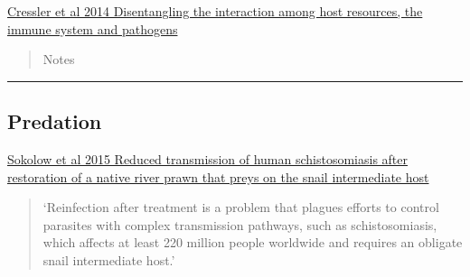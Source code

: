 \documentclass[10,portrait]{article}
\begin{document}
\href{https://onlinelibrary.wiley.com/doi/pdf/10.1111/ele.12229}{Cressler
et al 2014 Disentangling the interaction among host resources, the
immune system and pathogens}

\begin{quote}
Notes
\end{quote}

\newpage  

\begin{center}\rule{0.5\linewidth}{\linethickness}\end{center}

\subsection{Predation}\label{predation}

\href{http://www.pnas.org/content/pnas/early/2015/07/15/1502651112.full.pdf}{Sokolow
et al 2015 Reduced transmission of human schistosomiasis after
restoration of a native river prawn that preys on the snail intermediate
host}

\begin{quote}
`Reinfection after treatment is a problem that plagues efforts to
control parasites with complex transmission pathways, such as
schistosomiasis, which affects at least 220 million people worldwide and
requires an obligate snail intermediate host.'
\end{quote}

\begin{quote}
\end{quote}

\printbibliography
\end{document}
